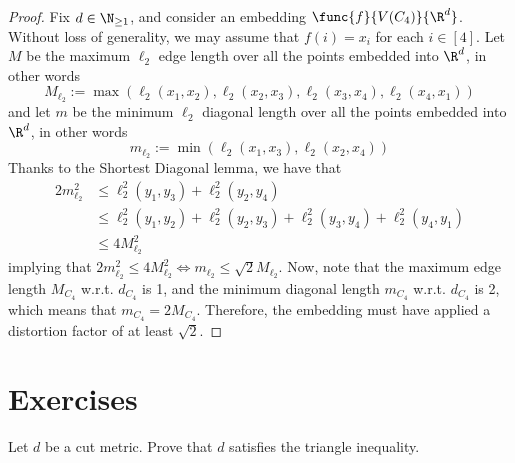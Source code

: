 \documentclass[a4paper, 12pt]{report}
\begin{document}
    \begin{proof}
        Fix $d \in \N_{\ge 1}$, and consider an embedding $\func{f}{V(C_4)}{\R^d}$. Without loss of generality, we may assume that $f(i) = x_i$ for each $i \in [4]$. Let $M$ be the maximum $\ell_2$ edge length over all the points embedded into $\R^d$, in other words $$M_{\ell_2} := \max(\ell_2(x_1, x_2), \ell_2(x_2, x_3), \ell_2(x_3, x_4), \ell_2(x_4, x_1))$$ and let $m$ be the minimum $\ell_2$ diagonal length over all the points embedded into $\R^d$, in other words $$m_{\ell_2} := \min(\ell_2(x_1, x_3), \ell_2(x_2, x_4))$$ Thanks to the Shortest Diagonal lemma, we have that
        \begin{equation*}
            \begin{split}
                2m_{\ell_2}^2 &\le \ell_2^2(y_1, y_3) + \ell_2^2(y_2, y_4) \\
                     &\le \ell_2^2(y_1, y_2) + \ell_2^2(y_2, y_3) + \ell_2^2(y_3, y_4) + \ell_2^2(y_4, y_1) \\
                     &\le 4M_{\ell_2}^2
            \end{split}
        \end{equation*}
        implying that $2m_{\ell_2}^2 \le 4M_{\ell_2}^2 \iff m_{\ell_2} \le \sqrt 2 M_{\ell_2}$. Now, note that the maximum edge length $M_{C_4}$ w.r.t. $d_{C_4}$ is 1, and the minimum diagonal length $m_{C_4}$ w.r.t. $d_{C_4}$ is 2, which means that $m_{C_4} = 2 M_{C_4}$. Therefore, the embedding must have applied a distortion factor of at least $\sqrt 2$.
    \end{proof}

    \section{Exercises}
    
    \begin{framedprob}{}
        Let $d$ be a cut metric. Prove that $d$ satisfies the triangle inequality.
    \end{framedprob}

\end{document}
